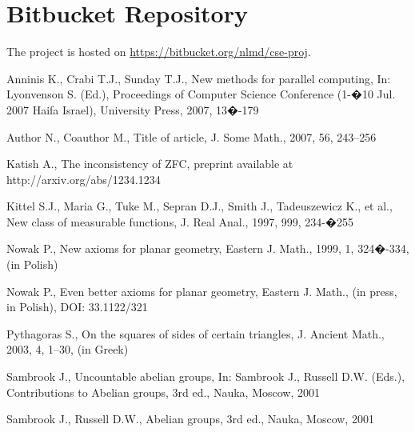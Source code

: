 \documentclass[PROP,PDF]{prop} %
\begin{document}
\section{Bitbucket Repository}
The project is hosted on \href{https://bitbucket.org/nlmd/cse-proj}{https://bitbucket.org/nlmd/cse-proj}.
\begin{thebibliography}{9}

 Anninis K., Crabi T.J., Sunday T.J., New methods for parallel computing, In: Lyonvenson S. (Ed.), Proceedings of Computer Science Conference (1-�10 Jul. 2007 Haifa Israel), University Press, 2007, 13�-179

 Author N., Coauthor M., Title of article, J. Some Math., 2007, 56, 243--256

 Katish A., The inconsistency of ZFC, preprint available at
http://arxiv.org/abs/1234.1234

 Kittel S.J., Maria G., Tuke M., Sepran D.J., Smith J., Tadeuszewicz K., et al., New class of measurable functions, J. Real Anal., 1997, 999, 234-�255

 Nowak P., New axioms for planar geometry, Eastern J. Math., 1999, 1, 324�-334, (in Polish)

 Nowak P., Even better axioms for planar geometry, Eastern J. Math., (in press, in Polish), DOI: 33.1122/321

 Pythagoras S., On the squares of sides of certain triangles, J. Ancient Math., 2003, 4, 1--30, (in Greek)

 Sambrook J., Uncountable abelian groups, In: Sambrook J., Russell D.W. (Eds.), Contributions to Abelian groups, 3rd ed., Nauka, Moscow, 2001

 Sambrook J., Russell D.W., Abelian groups, 3rd ed., Nauka, Moscow, 2001

\end{thebibliography}
\end{document}
